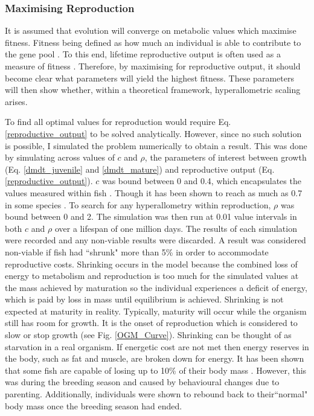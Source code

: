 \documentclass[a4paper, 11pt, hidelinks]{article} %
\begin{document}
	\subsubsection{Maximising Reproduction}
	It is assumed that evolution will converge on metabolic values which maximise fitness. 
	Fitness being defined as how much an individual is able to contribute to the gene pool \parencite{Speakman2008, Stearns2000}.  %
	To this end, lifetime reproductive output is often used as a measure of fitness \parencite{Charnov1991, Audzijonyte2018, Speakman2008, Stearns2000, Charnov2001, Tsoukali2016, Brown1993, Charnov2007}.  Therefore, by maximising for reproductive output, it should become clear what parameters will yield the highest fitness.  These parameters will then show whether, within a theoretical framework, hyperallometric scaling arises.
	
	To find all optimal values for reproduction would require Eq. \ref{reproductive_output} to be solved analytically.  However, since no such solution is possible, I simulated the problem numerically to obtain a result.  This was done by simulating across values of $ c $ and $ \rho $, the parameters of interest between growth (Eq. \ref{dmdt_juvenile} and \ref{dmdt_mature}) and reproductive output (Eq. \ref{reproductive_output}).  $ c $ was bound between 0 and 0.4, which encapsulates the values measured within fish \parencite{Benoit2018, Roff1983, Fontoura2009, Lambert2000, Wootton1985}.  Though it has been shown to reach as much as 0.7 in some species \parencite{Parker2018}.  To search for any hyperallometry within reproduction, $ \rho $ was bound between 0 and 2.  
	The simulation was then run at 0.01 value intervals in both $c$ and $\rho$ over a lifespan of one million days.  The results of each simulation were recorded and any non-viable results were discarded.  A result was considered non-viable if fish had ``shrunk" more than 5\% in order to accommodate reproductive costs.  Shrinking occurs in the model because  the combined loss of energy to metabolism and reproduction is too much for the simulated values at the mass achieved by maturation so the individual experiences a deficit of energy, which is paid by loss in mass until equilibrium is achieved. %
	Shrinking is not expected at maturity in reality.  Typically, maturity will occur while the organism still has room for growth.  It is the onset of reproduction which is considered to slow or stop growth %
	 (see Fig. \ref{OGM_Curve}).  Shrinking can be thought of as starvation in a real organism.  If energetic cost are not met then energy reserves in the body, such as fat and muscle, are broken down for energy.  It has been shown that some fish are capable of losing up to 10\% of their body mass \parencite{VandenBerghe1992}.  However, this was during the breeding season and caused by behavioural changes due to parenting.  Additionally, individuals were shown to rebound back to their``normal" body mass once the breeding season had ended. %
\end{document}
